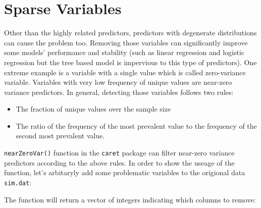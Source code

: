 \documentclass[
  12pt,
]{krantz}
\makeatletter
\newenvironment{Shaded}{\begin{snugshade}}{\end{snugshade}}
\newcommand{\CommentTok}[1]{\textcolor[rgb]{0.37,0.37,0.37}{\textit{#1}}}
\newcommand{\DecValTok}[1]{\textcolor[rgb]{0.06,0.06,0.06}{#1}}
\newcommand{\FunctionTok}[1]{\textcolor[rgb]{0,0,0}{#1}}
\newcommand{\NormalTok}[1]{#1}
\newcommand{\OtherTok}[1]{\textcolor[rgb]{0.37,0.37,0.37}{#1}}
\newcommand{\SpecialCharTok}[1]{\textcolor[rgb]{0,0,0}{#1}}
\providecommand{\tightlist}{%
  \setlength{\itemsep}{0pt}\setlength{\parskip}{0pt}}
\newenvironment{kframe}{%
\medskip{}
\setlength{\fboxsep}{.8em}
 \def\at@end@of@kframe{}%
 \ifinner\ifhmode%
  \def\at@end@of@kframe{\end{minipage}}%
  \begin{minipage}{\columnwidth}%
 \fi\fi%
 \def\FrameCommand##1{\hskip\@totalleftmargin \hskip-\fboxsep
 \colorbox{shadecolor}{##1}\hskip-\fboxsep
     \hskip-\linewidth \hskip-\@totalleftmargin \hskip\columnwidth}%
 \MakeFramed {\advance\hsize-\width
   \@totalleftmargin\z@ \linewidth\hsize
   \@setminipage}}%
 {\par\unskip\endMakeFramed%
 \at@end@of@kframe}
\renewenvironment{Shaded}{\begin{kframe}}{\end{kframe}}
\makeatother
\begin{document}
\hypertarget{sparse-variables}{%
\section{Sparse Variables}\label{sparse-variables}}

Other than the highly related predictors, predictors with degenerate distributions can cause the problem too. Removing those variables can significantly improve some models' performance and stability (such as linear regression and logistic regression but the tree based model is impervious to this type of predictors). One extreme example is a variable with a single value which is called zero-variance variable. Variables with very low frequency of unique values are near-zero variance predictors. In general, detecting those variables follows two rules:

\begin{itemize}
\tightlist
\item
  The fraction of unique values over the sample size
\item
  The ratio of the frequency of the most prevalent value to the frequency of the second most prevalent value.
\end{itemize}

\texttt{nearZeroVar()} function in the \texttt{caret} package can filter near-zero variance predictors according to the above rules. In order to show the useage of the function, let's arbitaryly add some problematic variables to the origional data \texttt{sim.dat}:

\begin{Shaded}
\end{Shaded}

The function will return a vector of integers indicating which columns to remove:
\end{document}
